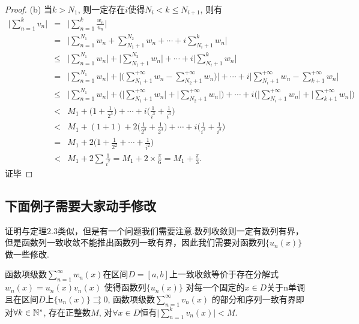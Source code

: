 \documentclass[a4paper,12pt,twoside]{ctexart}
\begin{document}
\begin{proof}
        (b) 当$k>N_1$, 则一定存在$i$使得$N_i<k\le N_{i+1}$, 则有\setcolsep
        \begin{eqnarray*}
        \Big\vert\sum_{n=1}^{k}v_n\Big\vert
            &=&\Big\vert\sum_{n=1}^{k}\frac{w_n}{u_n}\Big\vert\\
            &=&\Big\vert\sum_{n=1}^{N_1}{w_n}+\sum_{N_1+1}^{N_2}w_n +\cdots+i\sum_{N_i+1}^{k}w_n\Big\vert\\
            &\le&\Big\vert\sum_{n=1}^{N_1}w_n\Big\vert +\Big\vert\sum_{N_1+1}^{N_2}w_n\Big\vert+\cdots +i\Big\vert\sum_{N_i+1}^{k}w_n\Big\vert\\
            &=&\Big\vert\sum_{n=1}^{N_1}w_n\Big\vert+\Big\vert\bigg(\sum_{N_1+1}^{+\infty}w_n -\sum_{N_2+1}^{+\infty}w_n\bigg)\Big\vert +\cdots+i\Big\vert\sum_{N_i+1}^{+\infty}w_n -\sum_{k+1}^{+\infty}w_n\Big\vert\\
            &\le&\Big\vert\sum_{n=1}^{N_1}w_n\Big\vert+ \bigg(\Big\vert\sum_{N_1+1}^{+\infty}w_n\Big\vert+\Big\vert\sum_{N_2+1}^{+\infty}w_n \Big\vert\bigg) +\cdots+i\bigg(\Big\vert\sum_{N_i+1}^{+\infty}w_n\Big\vert +\Big\vert\sum_{k+1}^{+\infty}w_n\Big\vert\bigg)\\
            &<& M_1+\bigg(1+\frac1{2^3}\bigg) +\cdots+i\bigg(\frac1{i^3}+\frac1{i^3}\bigg)\\
            &<& M_1+(1+1)+2\bigg(\frac1{2^3}+\frac1{2^3}\bigg) +\cdots+i\bigg(\frac1{i^3}+\frac1{i^3}\bigg)\\
            &=& M_1+2\bigg(1+\frac1{2^2}+\cdots+\frac1{i^2}\bigg)\\
        &<& M_1+2\sum\frac1{i^2}=M_1+2\times\frac\pi6
        = M_1+\frac\pi3.
        \end{eqnarray*}
        证毕
    \end{proof}


\subsection{下面例子需要大家动手修改}
证明与定理2.3类似，但是有一个问题我们需要注意.数列收敛则一定有数列有界，但是函数列一致收敛不能推出函数列一致有界，因此我们需要对函数列$\{u_n(x)\}$做一些修改.
    \begin{theo}\label{theo}
    函数项级数$\sum_{n=1}^{\infty}{w_n(x)}$在区间$D=[a,b]$上一致收敛等价于存在分解式$w_n(x)={u_n(x)}{v_n(x)}$ 使得函数列$\{u_n(x)\}$ 对每一个固定的$x\in D$关于n单调且在区间$D$上$\{u_n(x)\}\rightrightarrows0$, 函数项级数$\sum_{n=1}^{\infty}{v_n(x)}$ 的部分和序列一致有界即对$\forall k\in{\mathbb N}^{*}$, 存在正整数$ M$, 对$\forall x\in D$恒有$\vert\sum_{n=1}^{k}{v_n(x)}\vert< M$.
    \end{theo}
\end{document}
